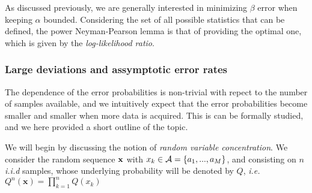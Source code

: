 As discussed previously, we are generally interested in minimizing $\beta$ error when keeping $\alpha$ bounded. Considering the set of all possible statistics that can be defined, the power Neyman-Pearson lemma is that of providing the optimal one, which is given by the \textit{log-likelihood ratio}.

\subsubsection{Large deviations and assymptotic error rates}
The dependence of the error probabilities is non-trivial with repect to the number of samples available, and we intuitively expect that the error probabilities become smaller and smaller when more data is acquired. This is can be formally studied, and we here provided a short outline of the topic.

We will begin by discussing the notion of \textit{random variable concentration}. We consider the random sequence $\mathbf{x}$ with $x_k \in \mathcal{A} = \lbrace a_1,...,a_M\rbrace$, and consisting on $n$ \textit{i.i.d} samples, whose underlying probability will be denoted by $Q$, \textit{i.e.} $Q^{n}(\mathbf{x}) = \prod_{k=1}^n Q(x_k)$

